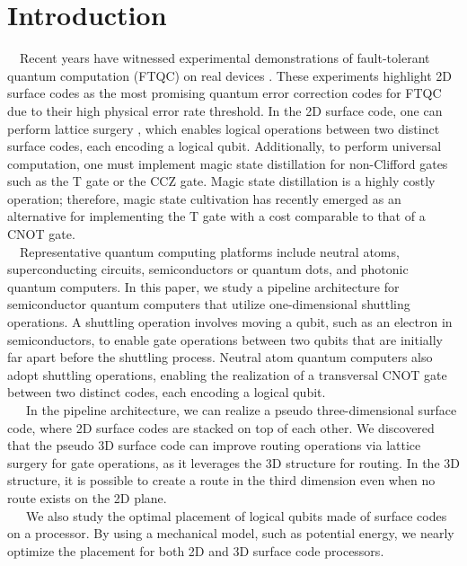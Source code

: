 \documentclass[a4paper,11pt]{ltjsarticle}
\begin{document}
\section{Introduction}
\ \ Recent years have witnessed experimental demonstrations of fault-tolerant quantum computation (FTQC) on real devices \cite{bluvstein2024}\cite{google2024}. These experiments highlight 2D surface codes as the most promising quantum error correction codes for FTQC due to their high physical error rate threshold. In the 2D surface code, one can perform lattice surgery \cite{horsman2012}, which enables logical operations between two distinct surface codes, each encoding a logical qubit. Additionally, to perform universal computation, one must implement magic state distillation \cite{litinski2019} for non-Clifford gates such as the T gate or the CCZ gate. Magic state distillation is a highly costly operation; therefore, magic state cultivation \cite{gidney2024} has recently emerged as an alternative for implementing the T gate with a cost comparable to that of a CNOT gate.\\
\ \ Representative quantum computing platforms include neutral atoms, superconducting circuits, semiconductors or quantum dots, and photonic quantum computers. In this paper, we study a pipeline architecture \cite{cai2023} for semiconductor quantum computers that utilize one-dimensional shuttling operations. A shuttling operation involves moving a qubit, such as an electron in semiconductors, to enable gate operations between two qubits that are initially far apart before the shuttling process. Neutral atom quantum computers also adopt shuttling operations, enabling the realization of a transversal CNOT gate between two distinct codes, each encoding a logical qubit.\\
\ \ \ In the pipeline architecture, we can realize a pseudo three-dimensional surface code, where 2D surface codes are stacked on top of each other. We discovered that the pseudo 3D surface code can improve routing operations via lattice surgery for gate operations, as it leverages the 3D structure for routing. In the 3D structure, it is possible to create a route in the third dimension even when no route exists on the 2D plane.\\
\ \ \ We also study the optimal placement of logical qubits made of surface codes on a processor. By using a mechanical model, such as potential energy, we nearly optimize the placement for both 2D and 3D surface code processors.\\
\end{document}

